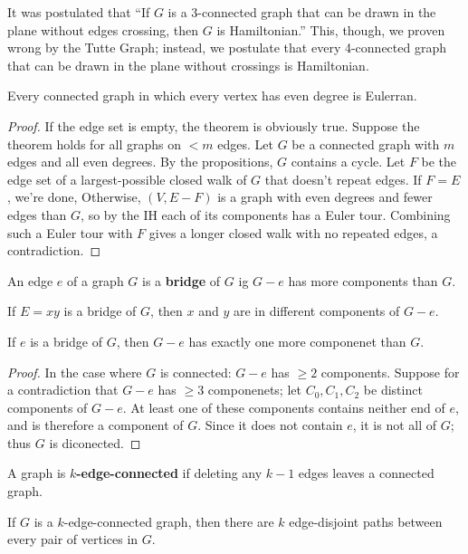 \documentclass[12pt]{article}
\begin{document}
It was postulated that ``If $G$ is a 3-connected graph that can be drawn in the plane without edges crossing, then $G$ is Hamiltonian.'' This, though, we proven wrong by the Tutte Graph; instead, we postulate that every 4-connected graph that can be drawn in the plane without crossings is Hamiltonian.


\begin{theorem}
Every connected graph in which every vertex has even degree is Eulerran.
\end{theorem}

\begin{proof}
If the edge set is empty, the theorem is obviously true. Suppose the theorem holds for all graphs on $< m$ edges. Let $G$ be a connected graph with $m$ edges and all even degrees. By the propositions, $G$ contains a cycle. Let $F$ be the edge set of a largest-possible closed walk of $G$ that doesn't repeat edges. If $F=E$, we're done, Otherwise, $(V,E-F)$ is a graph with even degrees and fewer edges than $G$, so by the IH each of its components has a Euler tour. Combining such a Euler tour with $F$ gives a longer closed walk with no repeated edges, a contradiction.
\end{proof}

An edge $e$ of a graph $G$ is a {\bf bridge} of $G$ ig $G-e$ has more components than $G$.

\begin{lemma}
If $E=xy$ is a bridge of $G$, then $x$ and $y$ are in different components of $G-e$.
\end{lemma}

\begin{lemma}
If $e$ is a bridge of $G$, then $G-e$ has exactly one more componenet than $G$.
\end{lemma}

\begin{proof}
In the case where $G$ is connected: $G-e$ has $\geq 2$ components. Suppose for a contradiction that $G-e$ has $\geq 3$ componenets; let $C_0, C_1, C_2$ be distinct components of $G-e$. At least one of these components contains neither end of $e$, and is therefore a component of $G$. Since it does not contain $e$, it is not all of $G$; thus $G$ is diconected.
\end{proof}

A graph is $k${\bf -edge-connected} if deleting any $k-1$ edges leaves a connected graph.

\begin{theorem}
If $G$ is a $k$-edge-connected graph, then there are $k$ edge-disjoint paths between every pair of vertices in $G$.
\end{theorem}
\end{document}

